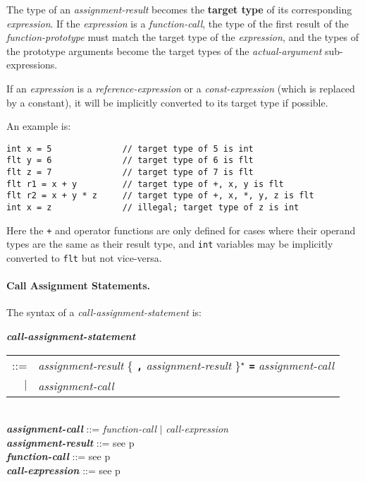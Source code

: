 \documentclass[12pt]{article}
\newcommand{\subsubsubsection}[1]{\paragraph[#1]{#1.}}
\newcommand{\TT}[1]{{\tt \bfseries #1}}
\newcommand{\STAR}{{\Large $^\star$}}
\newcommand{\key}[1]{{\rm \bfseries #1}}
\newcommand{\emkey}[1]{{\em \bfseries #1}}
\newcommand{\pagref}[1]{p\pageref{#1}}
\newenvironment{indpar}[1][0.3in]%
	{\begin{list}{}%
		     {\setlength{\itemsep}{0in}%
		      \setlength{\topsep}{0in}%
		      \setlength{\parsep}{1ex}%
		      \setlength{\labelwidth}{#1}%
		      \setlength{\leftmargin}{#1}%
		      \addtolength{\leftmargin}{\labelsep}}%
	 \item}%
	{\end{list}}
\begin{document}
The type of an {\em assignment-result} becomes the \key{target type}
of its corresponding {\em expression}.  If the {\em expression}
is a {\em function-call}, the type of the first result of the
{\em function-prototype} must match the target type of the {\em expression},
and the types of the prototype arguments become the target types
of the {\em actual-argument} sub-expressions.

If an {\em expression} is a {\em reference-expression}
or a {\em const-expression}
(which is replaced by a constant),
it will be implicitly
converted to its target type if possible.

An example is:
\begin{indpar}\begin{verbatim}
int x = 5              // target type of 5 is int
flt y = 6              // target type of 6 is flt
flt z = 7              // target type of 7 is flt
flt r1 = x + y         // target type of +, x, y is flt
flt r2 = x + y * z     // target type of +, x, *, y, z is flt
int x = z              // illegal; target type of z is int
\end{verbatim}\end{indpar}

Here the {\tt +} and {\tt *} operator functions are only defined
for cases where their operand types are the same as their result type,
and {\tt int} variables may be implicitly converted to {\tt flt}
but not vice-versa.

\subsubsubsection{Call Assignment Statements}
\label{CALL-ASSIGNMENT-STATEMENTS}

The syntax of a {\em call-assignment-statement} is:
\begin{indpar}
\emkey{call-assignment-statement} \\
\hspace*{0.5in} \begin{tabular}{rl}
                ::= & {\em assignment-result}
                      \{ \TT{,} {\em assignment-result} \}\STAR{}
		      \TT{=} {\em assignment-call} \\
		$|$ & {\em assignment-call}
		\end{tabular}
\\[0.5ex]
\emkey{assignment-call} ::= {\em function-call} $|$
                            {\em call-expression}
\\[0.5ex]
\emkey{assignment-result} ::= see \pagref{ASSIGNMENT-RESULT}
\\[0.5ex]
\emkey{function-call} ::= see \pagref{FUNCTION-CALL}
\\[0.5ex]
\emkey{call-expression} ::= see \pagref{CALL-EXPRESSION}
\end{indpar}
\end{document}
